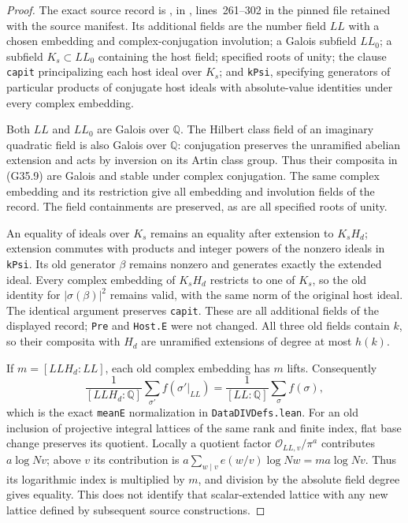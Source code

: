 \begin{proof}
The exact source record is
, in
,
lines~261--302 in the pinned file retained with the source manifest.
Its additional fields are the number field $LL$ with a chosen
embedding and complex-conjugation involution; a Galois
subfield $LL_0$; a subfield $K_s\subset LL_0$ containing the
host field; specified roots of unity; the clause
\texttt{capit} principalizing each host ideal over $K_s$;
and \texttt{kPsi}, specifying generators of particular
products of conjugate host ideals with absolute-value identities
under every complex embedding.

Both $LL$ and $LL_0$ are Galois over $\mathbb Q$.
The Hilbert class field of an imaginary quadratic field is
also Galois over $\mathbb Q$: conjugation preserves the
unramified abelian extension and acts by inversion on its
Artin class group.  Thus their composita in (G35.9) are
Galois and stable under complex conjugation.
The same complex embedding and its restriction give all
embedding and involution fields of the record.
The field containments are preserved, as are all specified
roots of unity.

An equality of ideals over $K_s$ remains an equality after
extension to $K_sH_d$; extension commutes with products and
integer powers of the nonzero ideals in \texttt{kPsi}.
Its old generator $\beta$ remains nonzero and generates
exactly the extended ideal.
Every complex embedding of $K_sH_d$ restricts to one of
$K_s$, so the old identity for $|\sigma(\beta)|^2$ remains
valid, with the same norm of the original host ideal.
The identical argument preserves \texttt{capit}.
These are all additional fields of the displayed record;
\texttt{Pre} and \texttt{Host.E} were not changed.
All three old fields contain $k$, so their composita with
$H_d$ are unramified extensions of degree at most $h(k)$.

If $m=[LLH_d:LL]$, each old complex embedding has $m$ lifts.
Consequently
\[
 \frac1{[LLH_d:\mathbb Q]}\sum_{\sigma'} f(\sigma'|_{LL})
       =\frac1{[LL:\mathbb Q]}\sum_\sigma f(\sigma),   \tag{G35.10}
\]
which is the exact \texttt{meanE} normalization in
\texttt{DataDIVDefs.lean}.
For an old inclusion of projective integral lattices of the
same rank and finite index, flat base change preserves its
quotient.  Locally a quotient factor $\mathcal O_{LL,v}/\pi^a$
contributes $a\log N v$; above $v$ its contribution is
$a\sum_{w\mid v}e(w/v)\log Nw=ma\log Nv$.
Thus its logarithmic index is multiplied by $m$, and division
by the absolute field degree gives equality.
This does not identify that scalar-extended lattice with
any new lattice defined by subsequent source constructions.
\end{proof}


